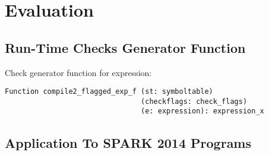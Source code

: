 \section{Evaluation}
\subsection{Run-Time Checks Generator Function}

Check generator function for expression: 
\begin{lstlisting}[escapechar=\#, language=coq, basicstyle=\small]
Function compile2_flagged_exp_f (st: symboltable) 
                                (checkflags: check_flags) 
                                (e: expression): expression_x
\end{lstlisting}

\subsection{Application To SPARK 2014 Programs}
